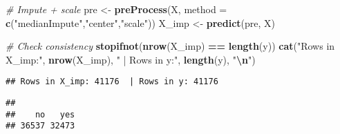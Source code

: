 \documentclass[
]{article}
\newenvironment{Shaded}{\begin{snugshade}}{\end{snugshade}}
\newcommand{\AttributeTok}[1]{\textcolor[rgb]{0.13,0.29,0.53}{#1}}
\newcommand{\CommentTok}[1]{\textcolor[rgb]{0.56,0.35,0.01}{\textit{#1}}}
\newcommand{\ConstantTok}[1]{\textcolor[rgb]{0.56,0.35,0.01}{#1}}
\newcommand{\DecValTok}[1]{\textcolor[rgb]{0.00,0.00,0.81}{#1}}
\newcommand{\DocumentationTok}[1]{\textcolor[rgb]{0.56,0.35,0.01}{\textbf{\textit{#1}}}}
\newcommand{\FunctionTok}[1]{\textcolor[rgb]{0.13,0.29,0.53}{\textbf{#1}}}
\newcommand{\NormalTok}[1]{#1}
\newcommand{\OtherTok}[1]{\textcolor[rgb]{0.56,0.35,0.01}{#1}}
\newcommand{\SpecialCharTok}[1]{\textcolor[rgb]{0.81,0.36,0.00}{\textbf{#1}}}
\newcommand{\StringTok}[1]{\textcolor[rgb]{0.31,0.60,0.02}{#1}}
\begin{document}
\begin{Shaded}
\begin{Highlighting}[]
\CommentTok{\# Impute + scale}
\NormalTok{pre }\OtherTok{\textless{}{-}} \FunctionTok{preProcess}\NormalTok{(X, }\AttributeTok{method =} \FunctionTok{c}\NormalTok{(}\StringTok{"medianImpute"}\NormalTok{,}\StringTok{"center"}\NormalTok{,}\StringTok{"scale"}\NormalTok{))}
\NormalTok{X\_imp }\OtherTok{\textless{}{-}} \FunctionTok{predict}\NormalTok{(pre, X)}

\CommentTok{\# Check consistency}
\FunctionTok{stopifnot}\NormalTok{(}\FunctionTok{nrow}\NormalTok{(X\_imp) }\SpecialCharTok{==} \FunctionTok{length}\NormalTok{(y))}
\FunctionTok{cat}\NormalTok{(}\StringTok{"Rows in X\_imp:"}\NormalTok{, }\FunctionTok{nrow}\NormalTok{(X\_imp), }\StringTok{" | Rows in y:"}\NormalTok{, }\FunctionTok{length}\NormalTok{(y), }\StringTok{"}\SpecialCharTok{\textbackslash{}n}\StringTok{"}\NormalTok{)}
\end{Highlighting}
\end{Shaded}

\begin{verbatim}
## Rows in X_imp: 41176  | Rows in y: 41176
\end{verbatim}

\begin{Shaded}
\end{Shaded}

\begin{verbatim}
## 
##    no   yes 
## 36537 32473
\end{verbatim}

\begin{Shaded}
\end{Shaded}
\end{document}
